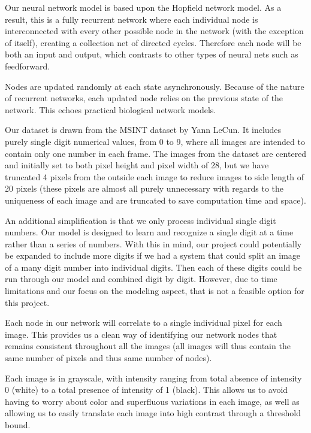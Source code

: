 \documentclass[]{article}
\theoremstyle{plain}
\theoremstyle{definition}
\begin{document}
Our neural network model is based upon the Hopfield network model.  As a result, this is a fully recurrent network where each individual node is interconnected with every other possible node in the network (with the exception of itself), creating a collection net of directed cycles.  Therefore each node will be both an input and output, which contrasts to other types of neural nets such as feedforward.


Nodes are updated randomly at each state asynchronously.  Because of the nature of recurrent networks, each updated node relies on the previous state of the network.  This echoes practical biological network models.

Our dataset is drawn from the MSINT dataset by Yann LeCun.
It includes purely single digit numerical values, from 0 to 9, where all images are intended to contain only one number in each frame.  The images from the dataset are centered and initially set to both pixel height and pixel width of 28, but we have truncated 4 pixels from the outside each image to reduce images to side length of 20 pixels (these pixels are almost all purely unnecessary with regards to the uniqueness of each image and are truncated to save computation time and space).

An additional simplification is that we only process individual single digit numbers.  Our model is designed to learn and recognize a single digit at a time rather than a series of numbers.  With this in mind, our project could potentially be expanded to include more digits if we had a system that could split an image of a many digit number into individual digits.  Then each of these digits could be run through our model and combined digit by digit.  However, due to time limitations and our focus on the modeling aspect, that is not a feasible option for this project.	

Each node in our network will correlate to a single individual pixel for each image.  This provides us a clean way of identifying our network nodes that remains consistent throughout all the images (all images will thus contain the same number of pixels and thus same number of nodes).


Each image is in grayscale, with intensity ranging from total absence of intensity 0 (white) to a total presence of intensity of 1 (black).  This allows us to avoid having to worry about color and superfluous variations in each image, as well as allowing us to easily translate each image into high contrast through a threshold bound.
\end{document}
